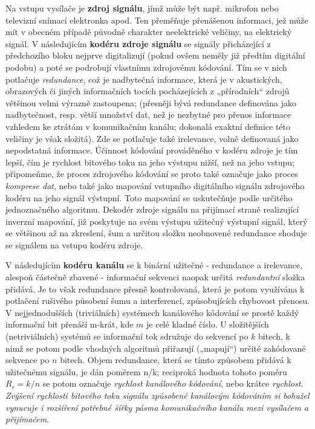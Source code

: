     Na vstupu vysílače je \textbf{zdroj signálu}, jímž může být např. mikrofon nebo televizní snímací 
    elektronka apod. Ten přeměňuje přenášenou informaci, jež může mít v obecném případě původně charakter 
    neelektrické veličiny, na elektrický signál. V následujícím \textbf{kodéru zdroje signálu} se signály 
    přicházející z předchozího bloku nejprve digitalizují (pokud ovšem neměly již předtím digitální podobu) 
    a poté se podrobují vlastnímu zdrojovému kódování. Tím se v nich potlačuje \emph{redundance}, což je 
    nadbytečná informace, která je v akustických, obrazových či jiných informačních tocích pocházejících z 
    „přírodních“ zdrojů většinou velmi výrazně zastoupena; (přesněji bývá redundance definována jako 
    nadbytečnost, resp. větší množství dat, než je nezbytné pro přenos informace vzhledem ke ztrátám v 
    komunikačním kanálu; dokonalá exaktní definice této veličiny je však složitá). Zde se potlačuje také 
    irelevance, volně definovaná jako nepodstatná informace. Účinnost kódování prováděného v kodéru zdroje je 
    tím lepší, čím je rychlost bitového toku na jeho výstupu nižší, než na jeho vstupu; připomeňme, že 
    proces zdrojového kódování se proto také označuje jako proces \emph{komprese dat}, nebo také jako 
    mapování vstupního digitálního signálu zdrojového kodéru na jeho signál výstupní. Toto mapování se 
    uskutečňuje podle určitého jednoznačného algoritmu. Dekodér zdroje signálu na přijímací straně 
    realizující inverzní mapování, již poskytuje na svém výstupu užitečný výstupní signál, který se většinou 
    až na zkreslení, šum a určitou složku neobnovené redundance shoduje se signálem na vstupu kodéru zdroje.
    
    V následujícím \textbf{kodéru kanálu} se k binární užitečné - redundance a irelevance, alespoň částečně 
    zbavené - informační sekvenci naopak určitá \emph{redundantní} složka přidává. Je to však redundance 
    přesně kontrolovaná, která je potom využívána k potlačení rušivého působení šumu a interferencí, 
    způsobujících chybovost přenosu. V nejjednodušších (triviálních) systémech kanálového kódování se prostě 
    každý informační bit přenáší m-krát, kde \(m\) je celé kladné číslo. U složitějších (netriviálních) 
    systémů se informační tok sdružuje do sekvencí po \(k\) bitech, k nimž se potom podle vhodných algoritmů 
    přiřazují („mapují“) určité zakódované sekvence po \(n\) bitech. Objem redundance, která se tímto 
    způsobem přidává k užitečnému signálu, je dán poměrem n/k; reciproká hodnota tohoto poměru \(R_c = k/n\) 
    se potom označuje \emph{rychlost kanálového kódování}, nebo krátce \emph{rychlost}. \emph{Zvýšení 
    rychlosti bitového toku signálu způsobené kanálovým kódováním si bohužel vynucuje i rozšíření potřebné 
    šířky pásma komunikačního kanálu mezi vysílačem a přijímačem}.
    
